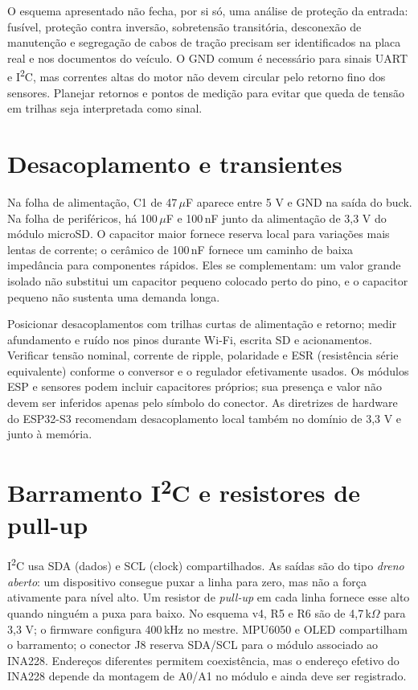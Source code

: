 O esquema apresentado não fecha, por si só, uma análise de proteção da entrada: fusível, proteção contra inversão, sobretensão transitória, desconexão de manutenção e segregação de cabos de tração precisam ser identificados na placa real e nos documentos do veículo. O GND comum é necessário para sinais UART e I\textsuperscript{2}C, mas correntes altas do motor não devem circular pelo retorno fino dos sensores. Planejar retornos e pontos de medição para evitar que queda de tensão em trilhas seja interpretada como sinal.

\section{Desacoplamento e transientes}
Na folha de alimentação, C1 de 47\,$\mu$F aparece entre 5 V e GND na saída do buck. Na folha de periféricos, há 100\,$\mu$F e 100\,nF junto da alimentação de 3,3 V do módulo microSD. O capacitor maior fornece reserva local para variações mais lentas de corrente; o cerâmico de 100\,nF fornece um caminho de baixa impedância para componentes rápidos. Eles se complementam: um valor grande isolado não substitui um capacitor pequeno colocado perto do pino, e o capacitor pequeno não sustenta uma demanda longa.

Posicionar desacoplamentos com trilhas curtas de alimentação e retorno; medir afundamento e ruído nos pinos durante Wi-Fi, escrita SD e acionamentos. Verificar tensão nominal, corrente de ripple, polaridade e ESR (resistência série equivalente) conforme o conversor e o regulador efetivamente usados. Os módulos ESP e sensores podem incluir capacitores próprios; sua presença e valor não devem ser inferidos apenas pelo símbolo do conector. As diretrizes de hardware do ESP32-S3 recomendam desacoplamento local também no domínio de 3,3 V e junto à memória.

\section{Barramento I\textsuperscript{2}C e resistores de pull-up}
I\textsuperscript{2}C usa SDA (dados) e SCL (clock) compartilhados. As saídas são do tipo \emph{dreno aberto}: um dispositivo consegue puxar a linha para zero, mas não a força ativamente para nível alto. Um resistor de \emph{pull-up} em cada linha fornece esse alto quando ninguém a puxa para baixo. No esquema v4, R5 e R6 são de 4,7\,k$\Omega$ para 3,3 V; o firmware configura 400\,kHz no mestre. MPU6050 e OLED compartilham o barramento; o conector J8 reserva SDA/SCL para o módulo associado ao INA228. Endereços diferentes permitem coexistência, mas o endereço efetivo do INA228 depende da montagem de A0/A1 no módulo e ainda deve ser registrado.


